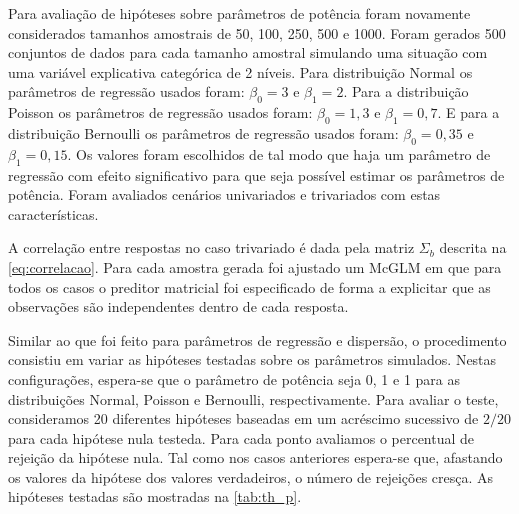 Para avaliação de hipóteses sobre parâmetros de potência foram novamente considerados tamanhos amostrais de 50, 100, 250, 500 e 1000. Foram gerados 500 conjuntos de dados para cada tamanho amostral simulando uma situação com uma variável explicativa categórica de 2 níveis. Para distribuição Normal os parâmetros de regressão usados foram: $\beta_0 = 3$ e $\beta_1 = 2$. Para a distribuição Poisson os parâmetros de regressão usados foram: $\beta_0 = 1,3$ e $\beta_1 = 0,7$. E para a distribuição Bernoulli os parâmetros de regressão usados foram: $\beta_0 = 0,35$ e $\beta_1 = 0,15$. Os valores foram escolhidos de tal modo que haja um parâmetro de regressão com efeito significativo para que seja possível estimar os parâmetros de potência. Foram avaliados cenários univariados e trivariados com estas características.

A correlação entre respostas no caso trivariado é dada pela matriz $\Sigma_b$ descrita na \autoref{eq:correlacao}. Para cada amostra gerada foi ajustado um McGLM em que para todos os casos o preditor matricial foi especificado de forma a explicitar que as observações são independentes dentro de cada resposta.

Similar ao que foi feito para parâmetros de regressão e dispersão, o procedimento consistiu em variar as hipóteses testadas sobre os parâmetros simulados. Nestas configurações, espera-se que o parâmetro de potência seja 0, 1 e 1 para as distribuições Normal, Poisson e Bernoulli, respectivamente. Para avaliar o teste, consideramos 20 diferentes hipóteses baseadas em um acréscimo sucessivo de $2/20$ para cada hipótese nula testeda. Para cada ponto avaliamos o percentual de rejeição da hipótese nula. Tal como nos casos anteriores espera-se que, afastando os valores da hipótese dos valores verdadeiros, o número de rejeições cresça. As hipóteses testadas são mostradas na \autoref{tab:th_p}.

